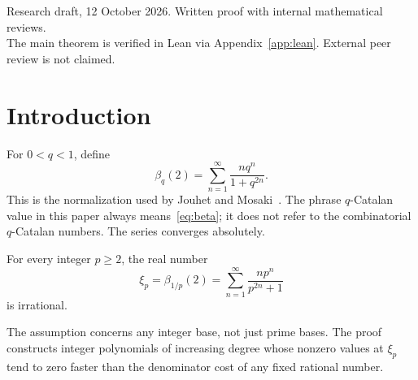 \begin{abstract}
We give a determinantal proof that $\beta_{1/p}(2)=\sum_{n\ge1}np^n/(p^{2n}+1)$ is irrational for every integer $p\ge2$. This is the Lambert-series $q$-analogue of Catalan's constant in the normalization of Jouhet and Mosaki. A signed Euler-derivative functional on an odd geometric lattice produces Hankel determinants that are polynomials in the single target value. Double zeros at early lattice points give cubic real decay. A local translation extracts common coefficient content at every prime dividing $p$, including composite bases, and root-of-unity cluster bases control the remaining denominators. At cyclotomic orders divisible by four, a double zero in a residue interpolant bounds the singular rank. The resulting integer polynomials have degree $K$ and nonzero values of size at most $\exp((-\delta+o(1))K^3\log p)$ infinitely often, where $\delta=1-1309/(150\pi^2)>0$. Rational interpolation proves the required nonvanishing without positivity. The general determinantal approach has earlier precedents; the contribution is the set of explicit arithmetic and analytic estimates for this signed functional.
\end{abstract}
\begin{center}\small
Research draft, 12 October 2026. Written proof with internal mathematical reviews.\\
The main theorem is verified in Lean via Appendix~\ref{app:lean}. External peer review is not claimed.
\end{center}
\tableofcontents
\clearpage
\section{Introduction}
For $0<q<1$, define
\begin{equation}\label{eq:beta}
 \beta_q(2)=\sum_{n=1}^{\infty}\frac{nq^n}{1+q^{2n}}.
\end{equation}
This is the normalization used by Jouhet and Mosaki~\cite[equation (1.1)]{JM}. The phrase $q$-Catalan value in this paper always means~\eqref{eq:beta}; it does not refer to the combinatorial $q$-Catalan numbers. The series converges absolutely.

\begin{theorem}\label{thm:main}
For every integer $p\ge2$, the real number
\begin{equation*}
 \xi_p=\beta_{1/p}(2)=\sum_{n=1}^{\infty}\frac{np^n}{p^{2n}+1}
\end{equation*}
is irrational.
\end{theorem}
The assumption concerns any integer base, not just prime bases. The proof constructs integer polynomials of increasing degree whose nonzero values at $\xi_p$ tend to zero faster than the denominator cost of any fixed rational number.

